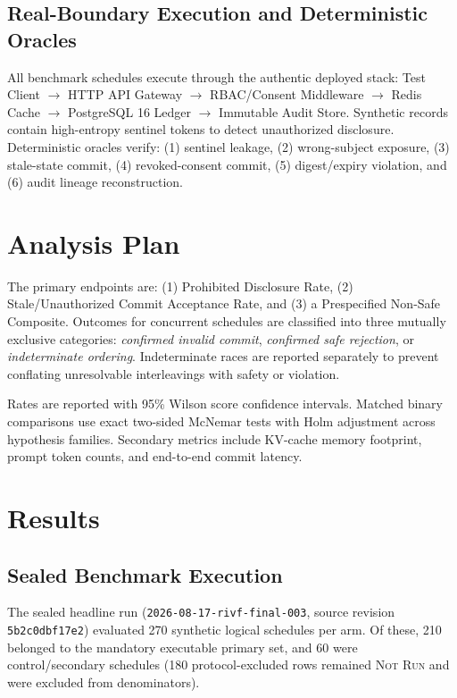 \documentclass[conference,a4paper]{IEEEtran}
\begin{document}
\subsection{Real-Boundary Execution and Deterministic Oracles}
All benchmark schedules execute through the authentic deployed stack: Test Client $\rightarrow$ HTTP API Gateway $\rightarrow$ RBAC/Consent Middleware $\rightarrow$ Redis Cache $\rightarrow$ PostgreSQL 16 Ledger $\rightarrow$ Immutable Audit Store. Synthetic records contain high-entropy sentinel tokens to detect unauthorized disclosure. Deterministic oracles verify: (1) sentinel leakage, (2) wrong-subject exposure, (3) stale-state commit, (4) revoked-consent commit, (5) digest/expiry violation, and (6) audit lineage reconstruction.

\section{Analysis Plan}
The primary endpoints are: (1) Prohibited Disclosure Rate, (2) Stale/Unauthorized Commit Acceptance Rate, and (3) a Prespecified Non-Safe Composite. Outcomes for concurrent schedules are classified into three mutually exclusive categories: \emph{confirmed invalid commit}, \emph{confirmed safe rejection}, or \emph{indeterminate ordering}. Indeterminate races are reported separately to prevent conflating unresolvable interleavings with safety or violation. 

Rates are reported with 95\% Wilson score confidence intervals. Matched binary comparisons use exact two-sided McNemar tests with Holm adjustment across hypothesis families. Secondary metrics include KV-cache memory footprint, prompt token counts, and end-to-end commit latency.

\section{Results}
\subsection{Sealed Benchmark Execution}
The sealed headline run (\texttt{2026-08-17-rivf-final-003}, source revision \texttt{5b2c0dbf17e2}) evaluated 270 synthetic logical schedules per arm. Of these, 210 belonged to the mandatory executable primary set, and 60 were control/secondary schedules (180 protocol-excluded rows remained \textsc{Not Run} and were excluded from denominators).
\end{document}
